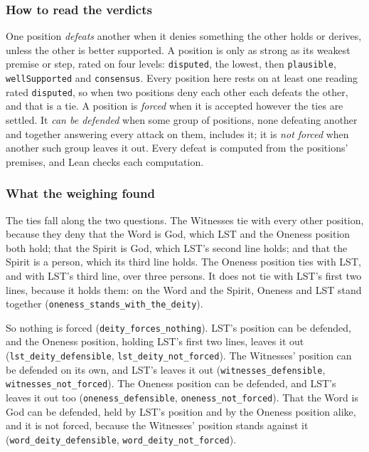 \documentclass[11pt,paper=\testimonypaper,DIV=13,parskip=false]{scrartcl}
\begin{document}
\subsubsection*{How to read the verdicts}
One position \emph{defeats} another when it denies something the other holds or derives, unless the other is better supported. A position is only as strong as its weakest premise or step, rated on four levels: \texttt{disputed}, the lowest, then \texttt{plausible}, \texttt{well\allowbreak{}Supported} and \texttt{consensus}. Every position here rests on at least one reading rated \texttt{disputed}, so when two positions deny each other each defeats the other, and that is a tie. A position is \emph{forced} when it is accepted however the ties are settled. It \emph{can be defended} when some group of positions, none defeating another and together answering every attack on them, includes it; it is \emph{not forced} when another such group leaves it out. Every defeat is computed from the positions’ premises, and Lean checks each computation.

\subsubsection*{What the weighing found}
The ties fall along the two questions. The Witnesses tie with every other position, because they deny that the Word is God, which LST and the Oneness position both hold; that the Spirit is God, which LST’s second line holds; and that the Spirit is a person, which its third line holds. The Oneness position ties with LST, and with LST’s third line, over three persons. It does not tie with LST’s first two lines, because it holds them: on the Word and the Spirit, Oneness and LST stand together (\texttt{oneness\_\allowbreak{}stands\_\allowbreak{}with\_\allowbreak{}the\_\allowbreak{}deity}).

So nothing is forced (\texttt{deity\_\allowbreak{}forces\_\allowbreak{}nothing}). LST’s position can be defended, and the Oneness position, holding LST’s first two lines, leaves it out (\texttt{lst\_\allowbreak{}deity\_\allowbreak{}defensible}, \texttt{lst\_\allowbreak{}deity\_\allowbreak{}not\_\allowbreak{}forced}). The Witnesses’ position can be defended on its own, and LST’s leaves it out (\texttt{witnesses\_\allowbreak{}defensible}, \texttt{witnesses\_\allowbreak{}not\_\allowbreak{}forced}). The Oneness position can be defended, and LST’s leaves it out too (\texttt{oneness\_\allowbreak{}defensible}, \texttt{oneness\_\allowbreak{}not\_\allowbreak{}forced}). That the Word is God can be defended, held by LST’s position and by the Oneness position alike, and it is not forced, because the Witnesses’ position stands against it (\texttt{word\_\allowbreak{}deity\_\allowbreak{}defensible}, \texttt{word\_\allowbreak{}deity\_\allowbreak{}not\_\allowbreak{}forced}).
\end{document}
